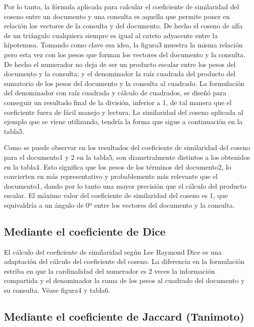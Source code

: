 \documentclass{article}
\begin{document}
Por lo tanto, la fórmula aplicada para calcular el coeficiente de similaridad del coseno entre un documento y una consulta es aquella que permite poner en relación los vectores de la consulta y del documento. De hecho el coseno de alfa de un triángulo cualquiera siempre es igual al cateto adyacente entre la hipotenusa. Tomando como clave esa idea, la figura3 muestra la misma relación pero esta vez con los pesos que forman los vectores del documento y la consulta. De hecho el numerador no deja de ser un producto escalar entre los pesos del documento y la consulta; y el denominador la raíz cuadrada del producto del sumatorio de los pesos del documento y la consulta al cuadrado. La formulación del denominador con raíz cuadrada y cálculo de cuadrados, se diseñó para conseguir un resultado final de la división, inferior a 1, de tal manera que el coeficiente fuera de fácil manejo y lectura. La similaridad del coseno aplicada al ejemplo que se viene utilizando, tendría la forma que sigue a continuación en la tabla5.

Como se puede observar en los resultados del coeficiente de similaridad del coseno para el documento1 y 2 en la tabla5, son diametralmente distintos a los obtenidos en la tabla4. Esto significa que los pesos de los términos del documento2, lo convierten en más representativo y probablemente más relevante que el documento1, dando por lo tanto una mayor precisión que el cálculo del producto escalar. El máximo valor del coeficiente de similaridad del coseno es 1, que equivaldría a un ángulo de 0º entre los vectores del documento y la consulta.



\subsection{Mediante el coeficiente de Dice}

El cálculo del coeficiente de similaridad según Lee Raymond Dice es una adaptación del cálculo del coeficiente del coseno. La diferencia en la formulación estriba en que la cardinalidad del numerador es 2 veces la información compartida y el denominador la suma de los pesos al cuadrado del documento y su consulta. Véase figura4 y tabla6. 



\subsection{Mediante el coeficiente de Jaccard (Tanimoto)}
\end{document}
